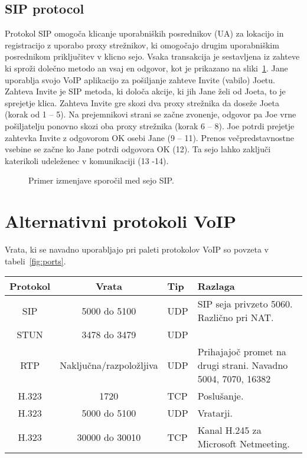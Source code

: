 \documentclass{acm_proc_article-sp}
\begin{document}
\subsection{SIP protocol}

Protokol SIP omogoča klicanje uporabniških posrednikov (UA) za lokacijo in registracijo z uporabo proxy strežnikov, ki omogočajo drugim uporabniškim posrednikom priključitev v klicno sejo. Vsaka transakcija je sestavljena iz zahteve ki sproži dolečno metodo an vsaj en odgovor, kot je prikazano na sliki~\ref{fig:sip}. Jane uporablja svojo VoIP aplikacijo za pošiljanje zahteve Invite (vabilo) Joetu. Zahteva Invite je SIP metoda, ki določa akcije, ki jih Jane želi od Joeta, to je sprejetje klica. Zahteva Invite gre skozi dva proxy strežnika da doseže Joeta (korak od 1 – 5). Na prejemnikovi strani se začne zvonenje, odgovor pa Joe vrne pošiljatelju ponovno skozi oba proxy strežnika (korak 6 – 8). Joe potrdi prejetje zahtevka Invite z odgovorom OK osebi Jane (9 – 11). Prenos večpredstavnostne vsebine se začne ko Jane potrdi odgovora OK (12). Ta sejo lahko zaključi katerikoli udeleženec v komunikaciji (13 -14).

\begin{figure}
\centering
{} %
\caption{Primer izmenjave sporočil med sejo SIP.}
\label{fig:sip}
\end{figure}

\section{Alternativni protokoli VoIP}
Vrata, ki se navadno uporabljajo pri paleti protokolov VoIP so povzeta v tabeli~\ref{fig:ports}.

\begin{table*}
\centering
\caption{Uporaba vrat pri protokolu VoIP}
\label{fig:ports}
\begin{tabular}{|c|c|l|l|} \hline
  Protokol&Vrata&Tip&Razlaga\\ \hline
  SIP & 5000 do 5100& UDP & SIP seja privzeto 5060. Različno pri NAT.\\ \hline
  STUN & 3478 do 3479& UDP & \\ \hline
  RTP & Naključna/razpoložljiva & UDP & Prihajajoč promet na drugi strani. Navadno 5004, 7070, 16382\\ \hline
  H.323 & 1720 & TCP & Poslušanje.\\ \hline
  H.323 & 5000 do 5100 & UDP & Vratarji.\\ \hline
  H.323 & 30000 do 30010 & TCP & Kanal H.245 za Microsoft Netmeeting.\\
\hline\end{tabular}
\end{table*}
\end{document}
